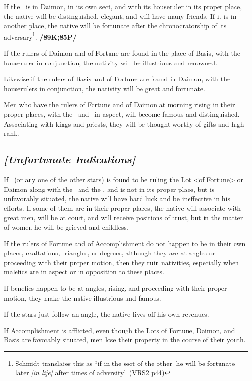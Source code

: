 If the \Sun\, is in Daimon, in its own sect, and with its houseruler in its proper place, the native will be distinguished, elegant, and will have many friends. If it is in another place, the native will be fortunate after the chronocratorship of its adversary\footnote{Schmidt translates this as ``if in the sect of the other, he will be fortunate later \textsl{[in life]} after times of adversity'' (VRS2 p44)}. \textbf{/89K;85P/}

If the rulers of Daimon and of Fortune are found in the place of Basis, with the houseruler in conjunction, the nativity will be illustrious and renowned. 

Likewise if the rulers of Basis and of Fortune are found in Daimon, with the houserulers in conjunction, the nativity will be great and fortunate. 

Men who have the rulers of Fortune and of Daimon at morning rising in their proper places, with the \Sun\, and \Moon\, in aspect, will become famous and distinguished. Associating with kings and priests, they will be thought worthy of gifts and high rank. 

\subsection{\textit{[Unfortunate Indications]}}
If \Venus\, (or any one of the other stars) is found to be ruling the Lot <of Fortune> or Daimon along with the \Sun\, and the \Moon, and is not in its proper place, but is unfavorably situated, the native will have hard luck and be ineffective in his efforts. If some of them are in their proper places, the native will associate with great men, will be at court, and will receive positions of trust, but in the matter of women he will be grieved and childless.

If the rulers of Fortune and of Accomplishment  do not happen to be in their own places, exaltations, triangles, or degrees, although they are at angles or proceeding with their proper motion, then they ruin nativities, especially when malefics are in aspect or in opposition to these places. 

If benefics happen to be at angles, rising, and proceeding with their proper motion, they make the native illustrious and famous. 

If the stars just follow an angle, the native lives off his own revenues.

If Accomplishment is afflicted, even though the Lots of Fortune, Daimon, and Basis are favorably situated, men lose their property in the course of their youth. 

